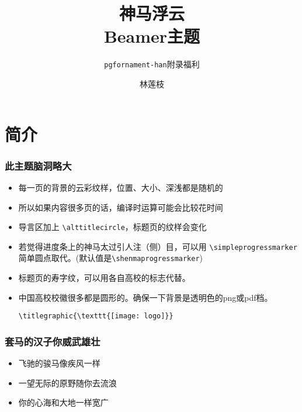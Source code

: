 \documentclass{ctexbeamer}
\author{林莲枝}
\title{神马浮云\\Beamer主题}
\subtitle{\texttt{pgfornament-han}附录福利}
\begin{document}
\begin{frame}[noframenumbering]
  \maketitle
\end{frame}

\section{简介}

\begin{frame}
  \frametitle{此主题脑洞略大}

  \begin{itemize}
    \item 每一页的背景的云彩纹样，位置、大小、深浅都是随机的
    \item 所以如果内容很多页的话，编译时运算可能会比较花时间
    \item 导言区加上 \verb|\alttitlecircle|，标题页的纹样会变化
    \item 若觉得进度条上的神马太过引人注（侧）目，可以用 \verb|\simpleprogressmarker| 简单圆点取代。(默认值是\verb|\shenmaprogressmarker|)

    \framebreak
    \item 标题页的寿字纹，可以用各自高校的标志代替。
    \item 中国高校校徽很多都是圆形的。确保一下背景是透明色的png或pdf档。

    \verb|\titlegraphic{\texttt{[image: logo]}}|

  \end{itemize}

\end{frame}

\begin{frame}
  \frametitle{套马的汉子你威武雄壮}

  \begin{itemize}
    \item 飞驰的骏马像疾风一样
    \item 一望无际的原野随你去流浪
    \item 你的心海和大地一样宽广
  \end{itemize}

\end{frame}
\end{document}
